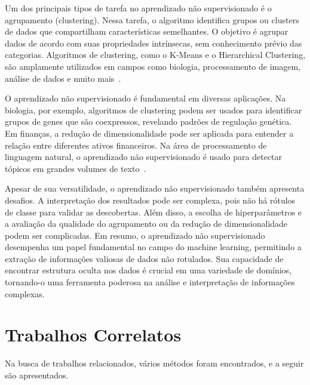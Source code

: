 Um dos principais tipos de tarefa no aprendizado não supervisionado é o agrupamento (clustering). Nessa tarefa, o algoritmo identifica grupos ou clusters de dados que compartilham características semelhantes. O objetivo é agrupar dados de acordo com suas propriedades intrínsecas, sem conhecimento prévio das categorias. Algoritmos de clustering, como o K-Means e o Hierarchical Clustering, são amplamente utilizados em campos como biologia, processamento de imagem, análise de dados e muito mais~\cite{machine_learning_bishop_2006}.

O aprendizado não supervisionado é fundamental em diversas aplicações. Na biologia, por exemplo, algoritmos de clustering podem ser usados para identificar grupos de genes que são coexpressos, revelando padrões de regulação genética. Em finanças, a redução de dimensionalidade pode ser aplicada para entender a relação entre diferentes ativos financeiros. Na área de processamento de linguagem natural, o aprendizado não supervisionado é usado para detectar tópicos em grandes volumes de texto~\cite{bioinformatics_david_2004}.


Apesar de sua versatilidade, o aprendizado não supervisionado também apresenta desafios. A interpretação dos resultados pode ser complexa, pois não há rótulos de classe para validar as descobertas. Além disso, a escolha de hiperparâmetros e a avaliação da qualidade do agrupamento ou da redução de dimensionalidade podem ser complicadas.
Em resumo, o aprendizado não supervisionado desempenha um papel fundamental no campo do machine learning, permitindo a extração de informações valiosas de dados não rotulados. Sua capacidade de encontrar estrutura oculta nos dados é crucial em uma variedade de domínios, tornando-o uma ferramenta poderosa na análise e interpretação de informações complexas\cite{learning_kernels_scholkopf_2002}.

\section{Trabalhos Correlatos}

Na busca de trabalhos relacionados, vários métodos foram encontrados, e a seguir são apresentados.

